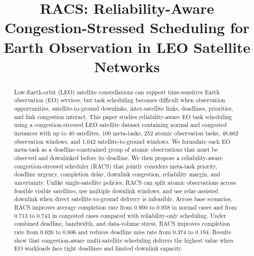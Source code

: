 \documentclass[conference]{IEEEtran}
\begin{document}
\title{RACS: Reliability-Aware Congestion-Stressed Scheduling for Earth Observation in LEO Satellite Networks}

\author{
\and
{}
\and
{}
}

\maketitle

\begin{abstract}
Low-Earth-orbit (LEO) satellite constellations can support time-sensitive Earth observation (EO) services, but task scheduling becomes difficult when observation opportunities, satellite-to-ground downlinks, inter-satellite links, deadlines, priorities, and link congestion interact. This paper studies reliability-aware EO task scheduling using a congestion-stressed LEO satellite dataset containing normal and congested instances with up to 40 satellites, 100 meta-tasks, 252 atomic observation tasks, 48,662 observation windows, and 1,042 satellite-to-ground windows. We formulate each EO meta-task as a deadline-constrained group of atomic observations that must be observed and downlinked before its deadline. We then propose a reliability-aware congestion-stressed scheduler (RACS) that jointly considers meta-task priority, deadline urgency, completion delay, downlink congestion, reliability margin, and uncertainty. Unlike single-satellite policies, RACS can split atomic observations across feasible visible satellites, use multiple downlink windows, and use relay-assisted downlink when direct satellite-to-ground delivery is infeasible. Across base scenarios, RACS improves average completion rate from 0.900 to 0.958 in normal cases and from 0.713 to 0.743 in congested cases compared with reliability-only scheduling. Under combined deadline, bandwidth, and data-volume stress, RACS improves completion rate from 0.626 to 0.806 and reduces deadline miss rate from 0.374 to 0.194. Results show that congestion-aware multi-satellite scheduling delivers the highest value when EO workloads face tight deadlines and limited downlink capacity.
\end{abstract}
\end{document}
